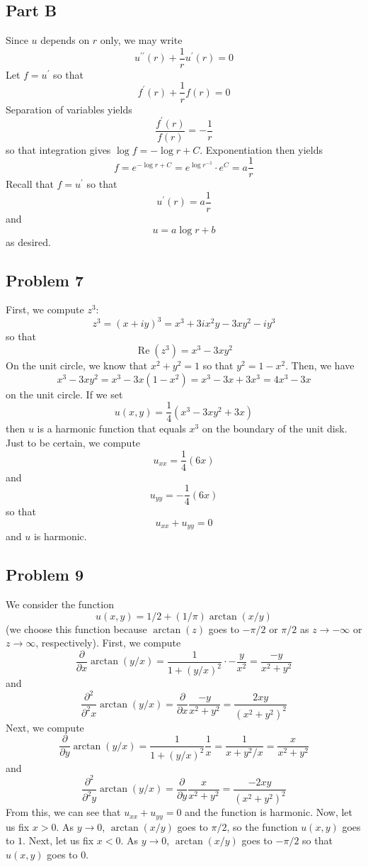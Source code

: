 \documentclass[12pt]{article}
\DeclareMathOperator{\re}{Re}
\begin{document}
\subsection*{Part B}
Since $u$ depends on $r$ only, we may write 
\[
u^{\prime\prime}(r) + \frac{1}{r} u^\prime(r) = 0
\] Let $f = u^\prime$ so that
\[
f^\prime(r) + \frac{1}{r} f(r) = 0
\] Separation of variables yields
\[
\frac{f^\prime(r)}{f(r)} = -\frac{1}{r}
\] so that integration gives $\log f = - \log r +C$. Exponentiation then yields
\[
f = e^{-\log r+ C} = e^{\log r^{-1}}\cdot e^C = a\frac{1}{r}
\] Recall that $f = u^\prime$ so that
\[
u^\prime(r) = a\frac{1}{r}
\] and 
\[
u = a\log r + b
\] as desired.
\newpage
\subsection*{Problem 7}
First, we compute $z^3$:
\[
z^3 = (x+iy)^3 = x^3 + 3ix^2y - 3xy^2 - iy^3 
\] so that
\[
\re(z^3) = x^3 - 3xy^2
\] On the unit circle, we know that $x^2 + y^2 = 1$ so that $y^2 = 1-x^2$. Then, we have
\[
x^3 - 3xy^2 = x^3 - 3x(1-x^2) = x^3 - 3x + 3x^3 = 4x^3 - 3x
\] on the unit circle. If we set 
\[
u(x,y) = \frac{1}{4}(x^3 - 3xy^2 + 3x)
\] then $u$ is a harmonic function that equals $x^3$ on the boundary of the unit disk. Just to be certain, we compute
\[
u_{xx} = \frac{1}{4}(6x)
\] and 
\[
u_{yy} = -\frac{1}{4}(6x)
\] so that 
\[
u_{xx} + u_{yy} = 0
\] and $u$ is harmonic.
\newpage
\subsection*{Problem 9}
We consider the function
\[
u(x,y) = 1/2+(1/\pi)\arctan(x/y)
\] (we choose this function because $\arctan(z)$ goes to $-\pi/2$ or $\pi/2$ as $z \rightarrow -\infty$ or $z \rightarrow \infty$, respectively). First, we compute
\[
\frac{\partial}{\partial{x}} \arctan(y/x) = \frac{1}{1+(y/x)^2} \cdot -\frac{y}{x^2} = \frac{-y}{x^2+y^2}
\] and
\[
\frac{\partial^2}{\partial^2{x}} \arctan(y/x) = \frac{\partial}{\partial{x}} \frac{-y}{x^2+y^2} = \frac{2xy}{(x^2+y^2)^2}
\] Next, we compute
\[
\frac{\partial}{\partial{y}} \arctan(y/x) = \frac{1}{1+(y/x)^2} \frac{1}{x} = \frac{1}{x+y^2/x} = \frac{x}{x^2+y^2}
\] and
\[
\frac{\partial^2}{\partial^2{y}} \arctan(y/x) = \frac{\partial}{\partial{y}} \frac{x}{x^2+y^2} = \frac{-2xy}{(x^2+y^2)^2}
\] From this, we can see that $u_{xx}+u_{yy} = 0$ and the function is harmonic. Now, let us fix $x > 0$. As $y \rightarrow 0$, $\arctan(x/y)$ goes to $\pi/2$, so the function $u(x,y)$ goes to $1$. Next, let us fix $x < 0$. As $y \rightarrow 0$, $\arctan(x/y)$ goes to $-\pi/2$ so that $u(x,y)$ goes to $0$.
\newpage
\end{document}
